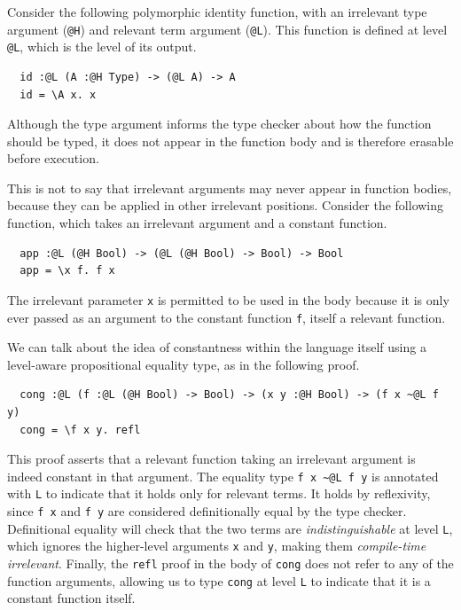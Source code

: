 \documentclass[acmsmall]{acmart}
\theoremstyle{linked}
\theoremstyle{deflinked}
\theoremstyle{acmdefinition}
\begin{document}
Consider the following polymorphic identity function,
with an irrelevant type argument (\lstinline{@H})
and relevant term argument (\lstinline{@L}). This
function is defined at level \lstinline{@L}, which is the level of
its output.

\begin{lstlisting}
  id :@L (A :@H Type) -> (@L A) -> A
  id = \A x. x
\end{lstlisting}

Although the type argument informs the type checker about how the function should be typed,
it does not appear in the function body and is therefore erasable
before execution.

This is not to say that irrelevant arguments may never appear in function bodies,
because they can be applied in other irrelevant positions.
Consider the following function,
which takes an irrelevant argument and a constant function.

\begin{lstlisting}
  app :@L (@H Bool) -> (@L (@H Bool) -> Bool) -> Bool
  app = \x f. f x
\end{lstlisting}

The irrelevant parameter \lstinline{x} is permitted to be used in the body
because it is only ever passed as an argument to the constant function \lstinline{f},
itself a relevant function.

We can talk about the idea of constantness within the language itself
using a level-aware propositional equality type, as in the following proof.

\begin{lstlisting}
  cong :@L (f :@L (@H Bool) -> Bool) -> (x y :@H Bool) -> (f x ~@L f y)
  cong = \f x y. refl
\end{lstlisting}

This proof asserts that a relevant function taking an irrelevant argument
is indeed constant in that argument.
The equality type \lstinline{f x ~@L f y} is annotated with \lstinline{L}
to indicate that it holds only for relevant terms.
It holds by reflexivity, since \lstinline{f x} and \lstinline{f y}
are considered definitionally equal by the type checker.
Definitional equality will check that the two terms are
\emph{indistinguishable} at level \lstinline{L},
which ignores the higher-level arguments \lstinline{x} and \lstinline{y},
making them \emph{compile-time irrelevant}.
Finally, the \lstinline{refl}
proof in the body of \lstinline{cong} does not refer to any of the
function arguments, allowing us to type \lstinline{cong} at level
\lstinline{L} to indicate that it is a constant function itself.
\end{document}
